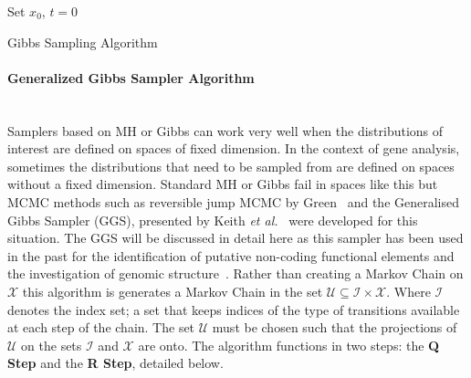\begin{algorithm}[H]
 Set $x_0$, $t=0$\; 
  \caption{Gibbs Sampling Algorithm}
\end{algorithm}

	\paragraph{Generalized Gibbs Sampler Algorithm}\~\\
\noindent
Samplers based on MH or Gibbs can work very well when the distributions of interest are defined on spaces of fixed dimension. In the context of gene analysis, sometimes the distributions that need to be sampled from are defined on spaces without a fixed dimension. Standard MH or Gibbs fail in spaces like this but MCMC methods such as reversible jump MCMC by Green~\cite{green1995reversible} and the Generalised Gibbs Sampler (GGS), presented by Keith \emph{et al.}~\cite{keith2004generalized} were developed for this situation. The GGS will be discussed in detail here as this sampler has been used in the past for the identification of putative non-coding functional elements and the investigation of genomic structure~\cite{algama2014drosophila}.%
Rather than creating a Markov Chain on ${\mathscr X}$ this algorithm is generates a Markov Chain in the set $\mathscr U \subseteq \mathscr I \times \mathscr X$. Where $\mathscr I$ denotes the index set; a set that keeps indices of the type of transitions available at each step of the chain. The set $\mathscr U$ must be chosen such that the projections of $\mathscr U$ on the sets $\mathscr I$ and $\mathscr X$ are onto. The algorithm functions in two steps: the \textbf{Q Step} and the \textbf{R Step}, detailed below. 


